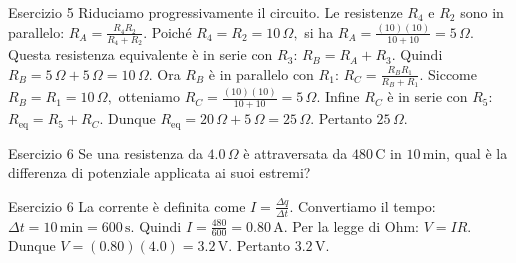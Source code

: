 \documentclass[a4paper]{article}
\begin{document}
\begin{snippetsolution}{Esercizio 5}
    Riduciamo progressivamente il circuito.
    Le resistenze \(R_4\) e \(R_2\) sono in parallelo:
    \(R_A = \frac{R_4R_2}{R_4+R_2}.\)
    Poiché
    \(R_4 = R_2 = 10\,\Omega,\)
    si ha
    \(R_A = \frac{(10)(10)}{10+10} = 5\,\Omega.\)
    Questa resistenza equivalente è in serie con \(R_3\):
    \(R_B = R_A + R_3.\)
    Quindi
    \(R_B = 5\,\Omega + 5\,\Omega = 10\,\Omega.\)
    Ora \(R_B\) è in parallelo con \(R_1\):
    \(R_C = \frac{R_BR_1}{R_B+R_1}.\)
    Siccome
    \(R_B = R_1 = 10\,\Omega,\)
    otteniamo
    \(R_C = \frac{(10)(10)}{10+10} = 5\,\Omega.\)
    Infine \(R_C\) è in serie con \(R_5\):
    \(R_{\mathrm{eq}} = R_5 + R_C.\)
    Dunque
    \(R_{\mathrm{eq}} = 20\,\Omega + 5\,\Omega = 25\,\Omega.\)
    Pertanto
    \(\boxed{25\,\Omega}.\)
\end{snippetsolution}
\begin{snippetexercise}{Esercizio 6}
    Se una resistenza da \(4.0\,\Omega\) è attraversata da \(480\,\mathrm{C}\)
    in \(10\,\mathrm{min}\), qual è la differenza di potenziale applicata ai
    suoi estremi?

\end{snippetexercise}
\begin{snippetsolution}{Esercizio 6}
    La corrente è definita come
    \(I = \frac{\Delta q}{\Delta t}.\)
    Convertiamo il tempo:
    \(\Delta t = 10\,\mathrm{min} = 600\,\mathrm{s}.\)
    Quindi
    \(I = \frac{480}{600} = 0.80\,\mathrm{A}.\)
    Per la legge di Ohm:
    \(V = IR.\)
    Dunque
    \(V = (0.80)(4.0) = 3.2\,\mathrm{V}.\)
    Pertanto
    \(\boxed{3.2\,\mathrm{V}}.\)
\end{snippetsolution}
\end{document}
